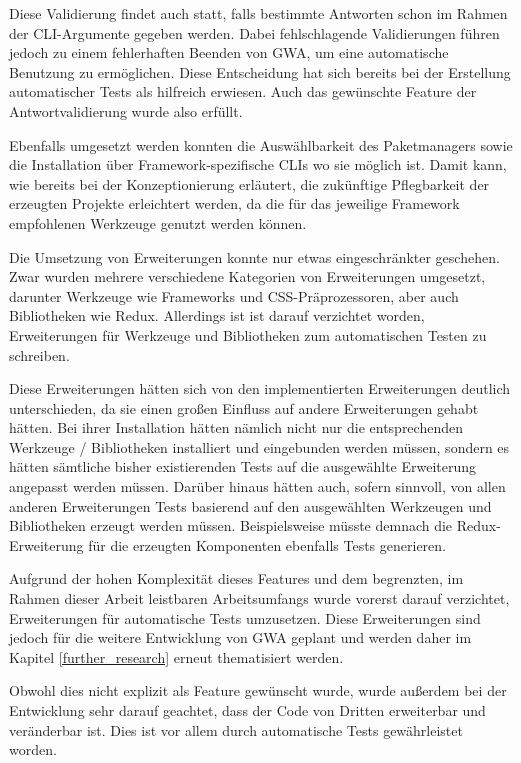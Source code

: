 Diese Validierung findet auch statt, falls bestimmte Antworten schon im Rahmen der \gls{CLI}-Argumente gegeben werden. Dabei fehlschlagende Validierungen führen jedoch zu einem fehlerhaften Beenden von \gls{GWA}, um eine automatische Benutzung zu ermöglichen. Diese Entscheidung hat sich bereits bei der Erstellung automatischer Tests als hilfreich erwiesen. Auch das gewünschte Feature der Antwortvalidierung wurde also erfüllt.

Ebenfalls umgesetzt werden konnten die Auswählbarkeit des Paketmanagers sowie die Installation über Framework-spezifische \gls{CLI}s wo sie möglich ist. Damit kann, wie bereits bei der Konzeptionierung erläutert, die zukünftige Pflegbarkeit der erzeugten Projekte erleichtert werden, da die für das jeweilige Framework empfohlenen Werkzeuge genutzt werden können.

Die Umsetzung von Erweiterungen konnte nur etwas eingeschränkter geschehen. Zwar wurden mehrere verschiedene Kategorien von Erweiterungen umgesetzt, darunter Werkzeuge wie Frameworks und CSS-Präprozessoren, aber auch Bibliotheken wie Redux. Allerdings ist ist darauf verzichtet worden, Erweiterungen für Werkzeuge und Bibliotheken zum automatischen Testen zu schreiben.

Diese Erweiterungen hätten sich von den implementierten Erweiterungen deutlich unterschieden, da sie einen großen Einfluss auf andere Erweiterungen gehabt hätten. Bei ihrer Installation hätten nämlich nicht nur die entsprechenden Werkzeuge / Bibliotheken installiert und eingebunden werden müssen, sondern es hätten sämtliche bisher existierenden Tests auf die ausgewählte Erweiterung angepasst werden müssen. Darüber hinaus hätten auch, sofern sinnvoll, von allen anderen Erweiterungen Tests basierend auf den ausgewählten Werkzeugen und Bibliotheken erzeugt werden müssen. Beispielsweise müsste demnach die Redux-Erweiterung für die erzeugten Komponenten ebenfalls Tests generieren.

Aufgrund der hohen Komplexität dieses Features und dem begrenzten, im Rahmen dieser Arbeit leistbaren Arbeitsumfangs wurde vorerst darauf verzichtet, Erweiterungen für automatische Tests umzusetzen. Diese Erweiterungen sind jedoch für die weitere Entwicklung von \gls{GWA} geplant und werden daher im Kapitel \ref{further_research} erneut thematisiert werden.

Obwohl dies nicht explizit als Feature gewünscht wurde, wurde außerdem bei der Entwicklung sehr darauf geachtet, dass der Code von Dritten erweiterbar und veränderbar ist. Dies ist vor allem durch automatische Tests gewährleistet worden.

